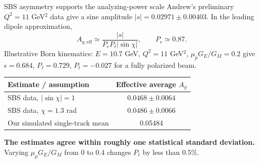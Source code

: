 \documentclass[aspectratio=169,10pt]{beamer}
\begin{document}
\begin{frame}{SBS asymmetry supports the analyzing-power scale}
  \small
  Andrew's preliminary $Q^2=11$ GeV$^2$ data give a sine amplitude
  $|s|=0.02971\pm0.00403$. In the leading dipole approximation,
  \[
    A_{y,\mathrm{eff}}\simeq
      \frac{|s|}{P_eP_\ell|\sin\chi|},
    \qquad P_e\simeq0.87.
  \]
  {\scriptsize Illustrative Born kinematics: $E=10.7$ GeV,
  $Q^2=11$ GeV$^2$, $\mu_pG_E/G_M=0.2$ give $\epsilon=0.684$,
  $P_\ell=0.729$, $P_t=-0.027$ for a fully polarized beam.}

  \vspace{0.12cm}
  \begin{center}
    \renewcommand{\arraystretch}{1.25}
    \begin{tabular}{@{}lc@{}}
      \toprule
      Estimate / assumption & Effective average $A_y$ \\
      \midrule
      SBS data, $|\sin\chi|=1$ & $0.0468\pm0.0064$ \\
      SBS data, $\chi=1.3$ rad & $0.0486\pm0.0066$ \\
      Our simulated single-track mean & 0.05484 \\
      \bottomrule
    \end{tabular}
  \end{center}
  \vspace{-0.10cm}
  \textbf{The estimates agree within roughly one statistical standard deviation.}
  Varying $\mu_pG_E/G_M$ from 0 to 0.4 changes $P_\ell$ by less than 0.5\%.


\end{frame}
\end{document}
